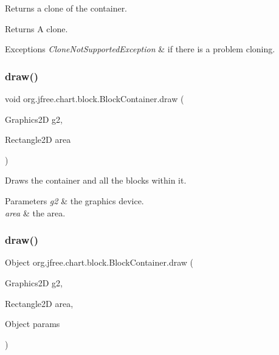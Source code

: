 Returns a clone of the container.

\begin{DoxyReturn}{Returns}
A clone.
\end{DoxyReturn}

\begin{DoxyExceptions}{Exceptions}
{\em Clone\+Not\+Supported\+Exception} & if there is a problem cloning. \\
\hline
\end{DoxyExceptions}
\mbox{\label{classorg_1_1jfree_1_1chart_1_1block_1_1_block_container_a50c5f0ce11d78284655354450fcc9ca0}} 
\subsubsection{\texorpdfstring{draw()}{draw()}\hspace{0.1cm}{\footnotesize\ttfamily [1/2]}}
{\footnotesize\ttfamily void org.\+jfree.\+chart.\+block.\+Block\+Container.\+draw (\begin{DoxyParamCaption}\item[{Graphics2D}]{g2,  }\item[{Rectangle2D}]{area }\end{DoxyParamCaption})}

Draws the container and all the blocks within it.


\begin{DoxyParams}{Parameters}
{\em g2} & the graphics device. \\
\hline
{\em area} & the area. \\
\hline
\end{DoxyParams}
\mbox{\label{classorg_1_1jfree_1_1chart_1_1block_1_1_block_container_ac2c5279f4ac5b5e89e48d11b195938a2}} 
\subsubsection{\texorpdfstring{draw()}{draw()}\hspace{0.1cm}{\footnotesize\ttfamily [2/2]}}
{\footnotesize\ttfamily Object org.\+jfree.\+chart.\+block.\+Block\+Container.\+draw (\begin{DoxyParamCaption}\item[{Graphics2D}]{g2,  }\item[{Rectangle2D}]{area,  }\item[{Object}]{params }\end{DoxyParamCaption})}

